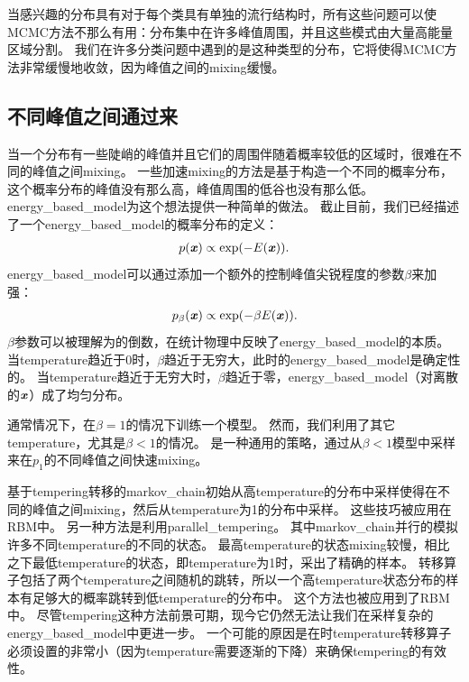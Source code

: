 当感兴趣的分布具有对于每个类具有单独的流行结构时，所有这些问题可以使MCMC方法不那么有用：分布集中在许多峰值周围，并且这些模式由大量高能量区域分割。
我们在许多分类问题中遇到的是这种类型的分布，它将使得MCMC方法非常缓慢地收敛，因为峰值之间的\gls{mixing}缓慢。



\subsection{不同峰值之间通过来}
\label{sec:tempering_to_mix_between_modes}

当一个分布有一些陡峭的峰值并且它们的周围伴随着概率较低的区域时，很难在不同的峰值之间\gls{mixing}。
一些加速\gls{mixing}的方法是基于构造一个不同的概率分布，这个概率分布的峰值没有那么高，峰值周围的低谷也没有那么低。
\gls{energy_based_model}为这个想法提供一种简单的做法。
截止目前，我们已经描述了一个\gls{energy_based_model}的概率分布的定义：
\begin{align}
\label{eqn:1725}
p(\boldsymbol{\mathit{x}}) \propto \exp(-E(\boldsymbol{\mathit{x}})).
\end{align}
\gls{energy_based_model}可以通过添加一个额外的控制峰值尖锐程度的参数$\beta$来加强：
\begin{align}
\label{eqn:1726}
p_{\beta}(\boldsymbol{\mathit{x}}) \propto \exp(-\beta E(\boldsymbol{\mathit{x}})).
\end{align}
$\beta$参数可以被理解为的倒数，在统计物理中反映了\gls{energy_based_model}的本质。
当\gls{temperature}趋近于0时，$\beta$趋近于无穷大，此时的\gls{energy_based_model}是确定性的。
当\gls{temperature}趋近于无穷大时，$\beta$趋近于零，\gls{energy_based_model}（对离散的$\boldsymbol{\mathit{x}}$）成了均匀分布。

通常情况下，在$\beta = 1$的情况下训练一个模型。
然而，我们利用了其它\gls{temperature}，尤其是$\beta < 1$的情况。
是一种通用的策略，通过从$\beta<1$模型中采样来在$p_1$的不同峰值之间快速\gls{mixing}。

基于\gls{tempering}转移的\gls{markov_chain}\citep{Neal94b}初始从高\gls{temperature}的分布中采样使得在不同的峰值之间\gls{mixing}，然后从\gls{temperature}为1的分布中采样。
这些技巧被应用在\gls{RBM}中\citep{Salakhutdinov-2010}。
另一种方法是利用\gls{parallel_tempering}\citep{Iba-2001}。
其中\gls{markov_chain}并行的模拟许多不同\gls{temperature}的不同的状态。
最高\gls{temperature}的状态\gls{mixing}较慢，相比之下最低\gls{temperature}的状态，即\gls{temperature}为1时，采出了精确的样本。
转移算子包括了两个\gls{temperature}之间随机的跳转，所以一个高\gls{temperature}状态分布的样本有足够大的概率跳转到低\gls{temperature}的分布中。
这个方法也被应用到了\gls{RBM}中\citep{Desjardins+al-2010-small,Cho10IJCNN}。
尽管\gls{tempering}这种方法前景可期，现今它仍然无法让我们在采样复杂的\gls{energy_based_model}中更进一步。
一个可能的原因是在时\gls{temperature}转移算子必须设置的非常小（因为\gls{temperature}需要逐渐的下降）来确保\gls{tempering}的有效性。




